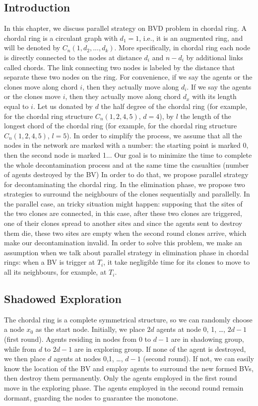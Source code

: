 \documentclass[conference]{IEEEtran}
\begin{document}
\subsection{Introduction}
In this chapter, we discuss parallel strategy on BVD problem in chordal ring. A chordal ring is a circulant graph with $d_1=1$, i.e., it is an augmented ring, and will be denoted by $C_n(1, d_2, ..., d_k)$. More specifically, in chordal ring each node is directly connected to the nodes at distance $d_i$ and $n-d_i$ by additional links called chords. The link connecting two nodes is labeled by the distance that separate these two nodes on the ring. 
For convenience, if we say the agents or the clones move along chord $i$, then they actually move along $d_i$. If we say the agents or the clones move $i$, then they actually move along chord $d_x$ with its length equal to $i$. Let us donated by $d$ the half degree of the chordal ring (for example, for the chordal ring structure $C_n(1,2,4,5)$, $d=4$), by $l$ the length of the longest chord of the chordal ring (for example, for the chordal ring structure $C_n(1,2,4,5)$, $l=5$). In order to simplify the process, we assume that all the nodes in the network are marked with a number: the starting point is marked 0, then the second node is marked 1... Our goal is to minimize the time to complete the whole decontamination process and at the same time the casualties (number of agents destroyed by the BV) In order to do that, we propose parallel strategy for decontaminating the chordal ring.
In the elimination phase, we propose two strategies to surround the neighbours of the clones sequentially and parallelly. In the parallel case, an tricky situation might happen: supposing that the sites of the two clones are connected, in this case, after these two clones are triggered, one of their clones spread to another sites and since the agents sent to destroy them die, these two sites are empty when the second round clones arrive, which make our decontamination invalid. In order to solve this problem, we make an assumption when we talk about parallel strategy in elimination phase in chordal rings: when a BV is trigger at $T_i$, it take negligible time for its clones to move to all its neighbours, for example, at $T_i$. 

\subsection{Shadowed Exploration}
The chordal ring is a complete symmetrical structure, so we can randomly choose a node $x_0$ as the start node. Initially, we place $2d$ agents at node 0, 1, \ldots , $2d-1$ (first round). Agents residing in nodes from $0$ to $d-1$ are in shadowing group, while from $d$ to $2d-1$ are in exploring group. If none of the agent is destroyed, we then place $d$ agents at nodes 0,1, \ldots, $d-1$ (second round). If not, we can easily know the location of the BV and employ agents to surround the new formed BVs, then destroy them permanently. Only the agents employed in the first round move in the exploring phase. The agents employed in the second round remain dormant, guarding the nodes to guarantee the monotone. 
\end{document}
